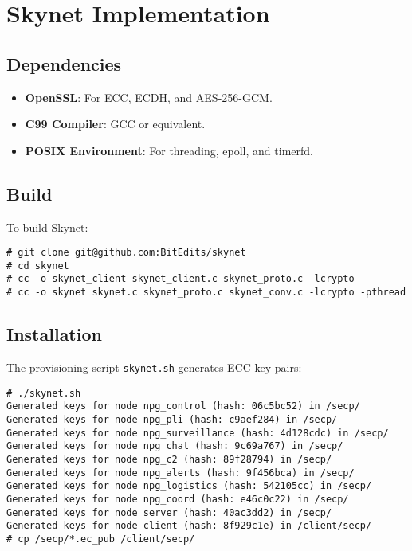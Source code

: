 \documentclass{article}
\begin{document}
\section{Skynet Implementation}

\subsection{Dependencies}
\begin{itemize}
    \item \textbf{OpenSSL}: For ECC, ECDH, and AES-256-GCM.
    \item \textbf{C99 Compiler}: GCC or equivalent.
    \item \textbf{POSIX Environment}: For threading, epoll, and timerfd.
\end{itemize}

\subsection{Build}
To build Skynet:
\begin{lstlisting}
# git clone git@github.com:BitEdits/skynet
# cd skynet
# cc -o skynet_client skynet_client.c skynet_proto.c -lcrypto
# cc -o skynet skynet.c skynet_proto.c skynet_conv.c -lcrypto -pthread
\end{lstlisting}

\newpage
\subsection{Installation}
The provisioning script \texttt{skynet.sh} generates ECC key pairs:
\begin{lstlisting}
# ./skynet.sh
Generated keys for node npg_control (hash: 06c5bc52) in /secp/
Generated keys for node npg_pli (hash: c9aef284) in /secp/
Generated keys for node npg_surveillance (hash: 4d128cdc) in /secp/
Generated keys for node npg_chat (hash: 9c69a767) in /secp/
Generated keys for node npg_c2 (hash: 89f28794) in /secp/
Generated keys for node npg_alerts (hash: 9f456bca) in /secp/
Generated keys for node npg_logistics (hash: 542105cc) in /secp/
Generated keys for node npg_coord (hash: e46c0c22) in /secp/
Generated keys for node server (hash: 40ac3dd2) in /secp/
Generated keys for node client (hash: 8f929c1e) in /client/secp/
# cp /secp/*.ec_pub /client/secp/
\end{lstlisting}
\end{document}
